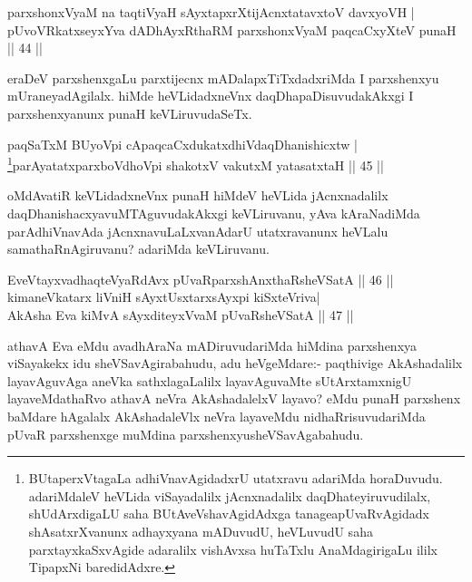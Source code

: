 
\begin{shl}
parxshonxV\s yaM na taqtiVyaH sAyxtapxrXtijAcnxtatavxtoV davxyoVH |\\
pUvoVRkatxseyxYva dADhAyxRthaRM parxshonxV\s yaM paqcaCxyXteV punaH \hfill || 44 ||
\end{shl}

\begin{artha}
eraDeV parxshenxgaLu parxtijecnx mADalapxTiTxdadxriMda I parxshenxyu mUraneyadAgilalx. hiMde heVLidadxneVnx daqDhapaDisuvudakAkxgi I parxshenxyanunx punaH keVLiruvudaSeTx.
\end{artha}


\begin{shl}
paqSaTxM BUyoV\s pi cApaqcaCxdukatxdhiVdaqDhanishicxtw |\\
\footnote{BUtaperxVtagaLa adhiVnavAgidadxrU utatxravu adariMda horaDuvudu. adariMdaleV heVLida viSayadalilx jAcnxnadalilx daqDhateyiruvudilalx, shUdArxdigaLU saha BUtAveVshavAgidAdxga tanage\break apUvaRvAgidadx shAsatxrXvanunx adhayxyana mADuvudU, heVLuvudU saha parxtayxkaSxvAgide adaralilx vishAvxsa huTaTxlu AnaMdagirigaLu ililx TipapxNi baredidAdxre.}parAyatatxparxboVdhoV\s pi shakotxV vakutxM yatasatxtaH \hfill || 45 ||
\end{shl}

\begin{artha}
oMdAvatiR keVLidadxneVnx punaH hiMdeV heVLida jAcnxnadalilx daqDhanishacxyavuMTAgu\-vudakAkxgi keVLiruvanu, yAva kAraNadiMda parAdhiVnavAda jAcnxnavuLaLxvanAdarU utatxravanunx heVLalu samathaRnAgiruvanu? adariMda keVLiruvanu.
\end{artha}

\begin{shl}
EveVtayxvadhaqteVyaRdAvx pUvaRparxshAnxthaRsheVSatA \hfill || 46 ||\\
kimaneVkatarx liVniH sAyxtUsxtarxsAyxpi kiSxteVriva|\\
AkAsha Eva kiMvA sAyxditeyxVvaM pUvaRsheVSatA \hfill || 47 ||
\end{shl}

\begin{artha}%
athavA Eva eMdu avadhAraNa mADiruvudariMda hiMdina parxshenxya viSayakekx idu sheVSavAgirabahudu, adu heVgeMdare:- paqthivige AkAshadalilx layavAguvAga aneVka sathxlagaLalilx layavAguvaMte sUtArxtamxnigU layaveMdathaRvo athavA neVra AkAshadalelxV layavo? eMdu punaH parxshenx baMdare hAgalalx AkAshadaleVlx neVra layaveMdu nidhaRrisuvudariMda pUvaR parxshenxge muMdina parxshenxyu\break sheVSavAgabahudu.
\end{artha}


